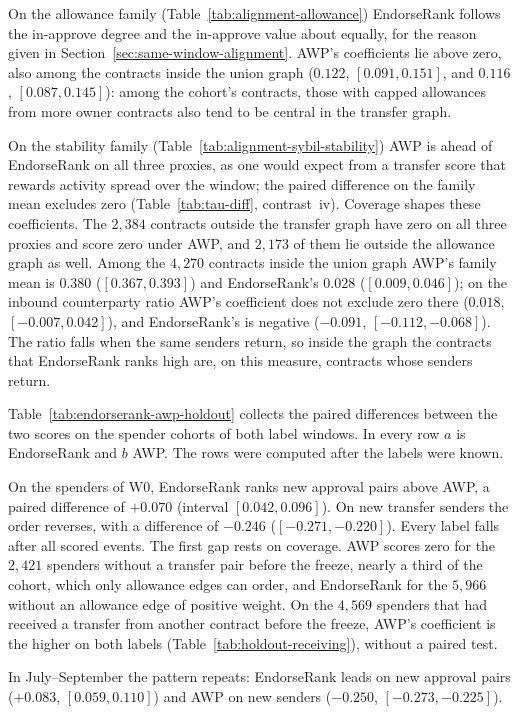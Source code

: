 

On the allowance family (Table~\ref{tab:alignment-allowance})\label{sub:allowance-family} EndorseRank follows the in-approve degree and the in-approve value about equally, for the reason given in Section~\ref{sec:same-window-alignment}. AWP's coefficients lie above zero, also among the contracts inside the union graph ($0.122$, $[0.091,0.151]$, and $0.116$, $[0.087,0.145]$): among the cohort's contracts, those with capped allowances from more owner contracts also tend to be central in the transfer graph.



On the stability family (Table~\ref{tab:alignment-sybil-stability})\label{sub:sybil-family} AWP is ahead of EndorseRank on all three proxies, as one would expect from a transfer score that rewards activity spread over the window; the paired difference on the family mean excludes zero (Table~\ref{tab:tau-diff}, contrast~iv). Coverage shapes these coefficients. The $2{,}384$ contracts outside the transfer graph have zero on all three proxies and score zero under AWP, and $2{,}173$ of them lie outside the allowance graph as well. Among the $4{,}270$ contracts inside the union graph AWP's family mean is $0.380$ ($[0.367,0.393]$) and EndorseRank's $0.028$ ($[0.009,0.046]$); on the inbound counterparty ratio AWP's coefficient does not exclude zero there ($0.018$, $[-0.007,0.042]$), and EndorseRank's is negative ($-0.091$, $[-0.112,-0.068]$). The ratio falls when the same senders return, so inside the graph the contracts that EndorseRank ranks high are, on this measure, contracts whose senders return.


Table~\ref{tab:endorserank-awp-holdout} collects the paired differences between the two scores on the spender cohorts of both label windows. In every row $a$ is EndorseRank and $b$ AWP. The rows were computed after the labels were known.



On the spenders of W0, EndorseRank ranks new approval pairs above AWP, a paired difference of $+0.070$ (interval $[0.042,0.096]$). On new transfer senders the order reverses, with a difference of $-0.246$ ($[-0.271,-0.220]$). Every label falls after all scored events. The first gap rests on coverage. AWP scores zero for the $2{,}421$ spenders without a transfer pair before the freeze, nearly a third of the cohort, which only allowance edges can order, and EndorseRank for the $5{,}966$ without an allowance edge of positive weight. On the $4{,}569$ spenders that had received a transfer from another contract before the freeze, AWP's coefficient is the higher on both labels (Table~\ref{tab:holdout-receiving}), without a paired test.

In July--September the pattern repeats: EndorseRank leads on new approval pairs ($+0.083$, $[0.059,0.110]$) and AWP on new senders ($-0.250$, $[-0.273,-0.225]$).
